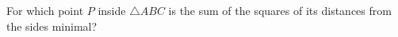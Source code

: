 For which point $P$ inside $\triangle ABC$ is the sum of the squares of its distances from the sides minimal?
